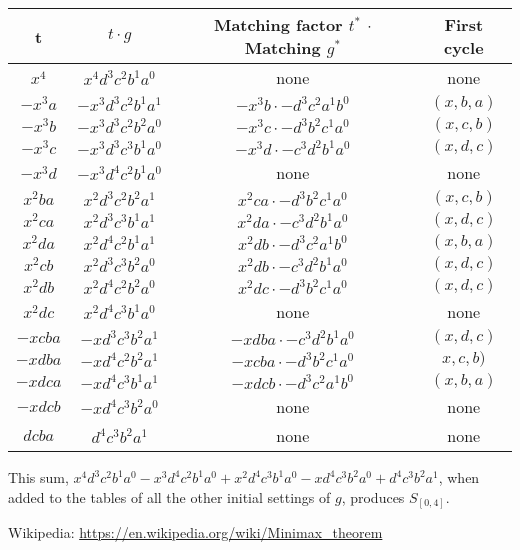 \documentclass[11pt, oneside]{article} 	%
\begin{document}
\begin{center}
\begin{tabular}{||c c c c||} 
 \hline
t & $t \cdot g$ & Matching factor $t^*$ $\cdot$ Matching $g^*$ & First cycle \\ [0.5ex] 
 \hline\hline
 $x^4$ & $x^4d^3c^2b^1a^0$ & none & none  \\ 
 \hline
 $-x^3a$ & $-x^3d^3c^2b^1a^1$ & $-x^3b \cdot -d^3c^2a^1b^0$ & $(x,b,a)$ \\ 
 \hline
 $-x^3b$ & $-x^3d^3c^2b^2a^0$ & $-x^3c \cdot -d^3b^2c^1a^0$ & $(x,c,b)$ \\ 
 \hline
 $-x^3c$ & $-x^3d^3c^3b^1a^0$ & $-x^3d \cdot -c^3d^2b^1a^0$ & $(x,d,c)$ \\ 
 \hline
 $-x^3d$ & $-x^3d^4c^2b^1a^0$ & none & none \\ 
 \hline
 $x^2ba$ & $x^2d^3c^2b^2a^1$ & $x^2ca \cdot -d^3b^2c^1a^0$ &  $(x,c,b)$ \\ 
  \hline
 $x^2ca$ & $x^2d^3c^3b^1a^1$ & $x^2da  \cdot -c^3d^2b^1a^0$ &  $(x,d,c)$ \\ 
 \hline
 $x^2da$ & $x^2d^4c^2b^1a^1$ & $x^2db  \cdot -d^3c^2a^1b^0$ &  $(x,b,a)$ \\ 

 \hline
 $x^2cb$ & $x^2d^3c^3b^2a^0$ & $x^2db  \cdot -c^3d^2b^1a^0$ &  $(x,d,c)$ \\ 
 \hline
 $x^2db$ & $x^2d^4c^2b^2a^0$ & $x^2dc  \cdot -d^3b^2c^1a^0$ &  $(x,d,c)$ \\ 
 
 
\hline
 $x^2dc$ & $x^2d^4c^3b^1a^0$ & none &   none \\ 
 
 \hline
 $-xcba$ & $-xd^3c^3b^2a^1$ & $-xdba  \cdot -c^3d^2b^1a^0$ &  $(x,d,c)$ \\ 

 \hline
 $-xdba$ & $-xd^4c^2b^2a^1$ & $-xcba  \cdot -d^3b^2c^1a^0$ &  $x,c,b)$ \\ 

 \hline
 $-xdca$ & $-xd^4c^3b^1a^1$ & $-xdcb  \cdot -d^3c^2a^1b^0$ &  $(x,b,a)$ \\ 

 \hline
 $-xdcb$ & $-xd^4c^3b^2a^0$ & none &  none \\ 
 
 
 \hline
 $dcba$ & $ d^4c^3b^2a^1 $ & none &  none \\ 
 
 \hline
\end{tabular}
\end{center}

This sum, $x^4d^3c^2b^1a^0-x^3d^4c^2b^1a^0+x^2d^4c^3b^1a^0-xd^4c^3b^2a^0+d^4c^3b^2a^1$, when added to the tables of all the other initial settings of $g$, produces $S_{[0,4]}$.


\begin{thebibliography}{9}
Wikipedia: \url{https://en.wikipedia.org/wiki/Minimax_theorem}
\end{thebibliography}
\end{document}
